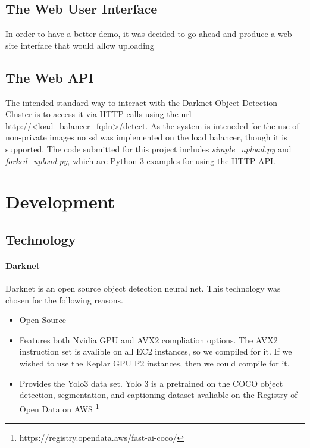 \documentclass[conference]{IEEEtran}
\begin{document}
\subsection{The Web User Interface}
In order to have a better demo, it was decided to go ahead and produce a web site interface that would allow uploading 
\subsection{The Web API}
The intended standard way to interact with the Darknet Object Detection Cluster is to access it via HTTP calls using the url http://\textless load\_balancer\_fqdn\textgreater/detect. As the system is inteneded for the use of non-private images no ssl was implemented on the load balancer, though it is supported.
The code submitted for this project includes \textit{simple\_upload.py} and \textit{forked\_upload.py}, which are Python 3 examples for using the HTTP API.
\section{Development}
\subsection{Technology}
\paragraph{Darknet}
Darknet is an open source object detection neural net. This technology was chosen for the following reasons.
\begin{itemize}
\item Open Source
\item Features both Nvidia GPU and AVX2 compliation options. The AVX2 instruction set is avalible on all EC2 instances, so we compiled for it. If we wished to use the Keplar GPU P2 instances, then we could compile for it.
\item Provides the Yolo3 data set. Yolo 3 is a pretrained on the COCO object detection, segmentation, and captioning dataset avaliable on the Registry of Open Data on AWS \footnote{https://registry.opendata.aws/fast-ai-coco/}
\end{itemize}
\end{document}

